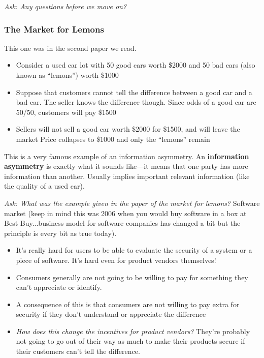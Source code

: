 \documentclass[11pt]{article}
\begin{document}
{\it Ask: Any questions before we move on?}


\subsubsection{The Market for Lemons}

This one was in the second paper we read. 

\begin{itemize}
    \item Consider a used car lot with 50 good cars worth \$2000 and 50 bad cars (also known as “lemons”) worth \$1000
    \item Suppose that customers cannot tell the difference between a good car and a bad car. The seller knows the difference though.
     Since odds of a good car are 50/50, customers will pay \$1500
    \item Sellers will not sell a good car worth \$2000 for \$1500, and will leave the market
    Price collapses to \$1000 and only the ``lemons'' remain
\end{itemize}

This is a very famous example of an information asymmetry. An {\bf information asymmetry} is exactly what it sounds like---it means that one party has more information than another. Usually implies important relevant information (like the quality of a used car).

{\it Ask: What was the example given in the paper of the market for lemons?} Software market (keep in mind this was 2006 when you would buy software in a box at Best Buy...business model for software companies has changed a bit but the principle is every bit as true today).
\begin{itemize}
    \item It's really hard for users to be able to evaluate the security of a system or a piece of software. It's hard even for product vendors themselves!
    \item Consumers generally are not going to be willing to pay for something they can't appreciate or identify. 
    \item A consequence of this is that consumers are not willing to pay extra for security if they don't understand or appreciate the difference
    \item {\it How does this change the incentives for product vendors?} They're probably not going to go out of their way as much to make their products secure if their customers can't tell the difference.
\end{itemize}
\end{document}
